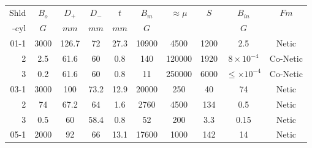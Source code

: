 \documentclass[12pt]{article}
\begin{document}
\begin{table}[htbp]
\begin{center}
\begin{tabular}{|r|c|c|c|c|c|c|c|c|c|} \hline
  Shld&$B_{o}$&$D_+$&$D_-$&$t$   &$B_m$  &$\approx\mu$&$S$   &$B_{in}$         & $Fm$    \\
  -cyl&  $G$  &$mm$ &$mm$ &$mm$  &$G$   &            &      &$G$            &          \\ \hline 
01-1    &3000 & 126.7 & 72  & 27.3   & 10900 & 4500       & 1200 & 2.5             & Netic    \\ \hline
 2    &2.5  &61.6 &  60 & 0.8  & 140   & 120000     & 1920 &$8\times10^{-4}$  & Co-Netic \\ \hline
 3    &0.2  &61.6 &  60 & 0.8  & 11    & 250000     & 6000 &$\leq\times10^{-4}$& Co-Netic \\ \hline\hline  
03-1    & 3000& 100 &  73.2 & 12.9  &20000 & 250        & 40 &  74           & Netic \\ \hline
 2    & 74 & 67.2  &64 & 1.6  &  2760 & 4500       & 134  &  0.5            & Netic       \\ \hline
 3    & 0.5 &   60 &58.4 &  0.8  &  52  &  200      & 3.3  & 0.15 & Netic      \\ \hline \hline
05-1    & 2000& 92  & 66  & 13.1 & 17600 & 1000       & 142  & 14               & Netic    \\ \hline

\end{tabular}
\end{center}
\end{table}
\end{document}
